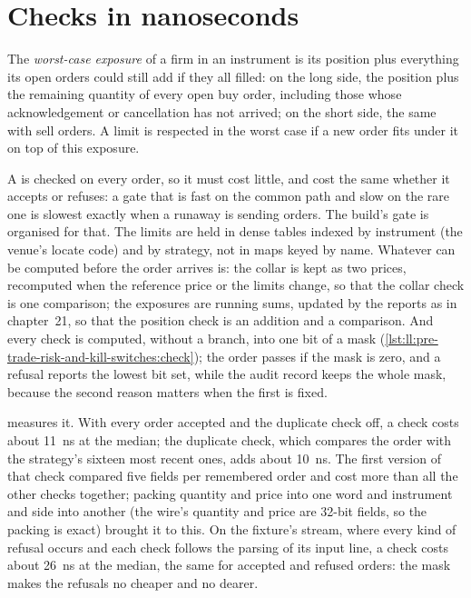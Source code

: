 \section{Checks in nanoseconds}

\begin{definition}\label{def:ll:pre-trade-risk-and-kill-switches:worst}
The \emph{worst-case exposure} of a firm in an instrument is its position plus everything its open
orders could still add if they all filled: on the long side, the position plus the remaining quantity of every open buy order,
including those whose acknowledgement or cancellation has not arrived; on the short side, the same with sell orders. A limit is
respected in the worst case if a new order fits under it on top of this exposure.
\end{definition}

A  is checked on every order, so it must cost little, and cost the same whether it accepts or refuses: a gate that is
fast on the common path and slow on the rare one is slowest exactly when a runaway is sending orders. The build's gate is
organised for that. The limits are held in dense tables indexed by instrument (the venue's locate code) and by strategy, not in
maps keyed by name. Whatever can be computed before the order arrives is: the collar is kept as two prices, recomputed when the
reference price or the limits change, so that the collar check is one comparison; the exposures are running sums, updated by
the reports as in chapter~21, so that the position check is an addition and a comparison. And every check is computed, without
a branch, into one bit of a mask (\cref{lst:ll:pre-trade-risk-and-kill-switches:check}); the order passes if the mask is zero,
and a refusal reports the lowest bit set, while the audit record keeps the whole mask, because the second reason matters when
the first is fixed.

\label{lst:ll:pre-trade-risk-and-kill-switches:check}

 measures it. With every order accepted and the duplicate check off, a check
costs about \qty{11}{\nano\second} at the median; the duplicate check, which compares the order with the strategy's sixteen
most recent ones, adds about \qty{10}{\nano\second}. The first version of that check compared five fields per remembered order
and cost more than all the other checks together; packing quantity and price into one word and instrument and side into another
(the wire's quantity and price are 32-bit fields, so the packing is exact) brought it to this. On the fixture's stream, where every kind of
refusal occurs and each check follows the parsing of its input line, a check costs about \qty{26}{\nano\second} at the median,
the same for accepted and refused orders: the mask makes the refusals no cheaper and no dearer.

